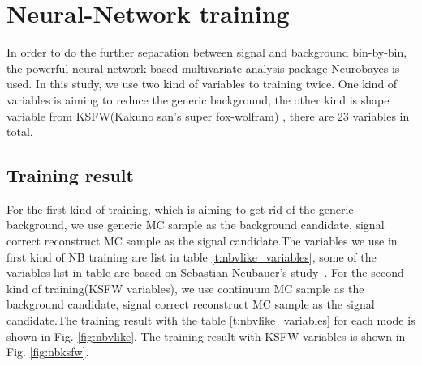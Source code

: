 \section{Neural-Network training}
In order to do the further separation between signal and background bin-by-bin, the powerful neural-network based multivariate analysis package Neurobayes is used. In this study, we use two kind of variables to training twice. One kind of variables is aiming to reduce the generic background; the other kind is shape variable from KSFW(Kakuno san's super fox-wolfram)\cite{ref:Lee2003} \cite{ref:fox1978}, there are 23 variables in total. 
\subsection{Training result} 
For the first kind of training, which is aiming to get rid of the generic background, we use generic MC sample as the background candidate, signal correct reconstruct MC sample as the signal candidate.The variables we use in first kind of NB training are list in table \ref{t:nbvlike_variables}, some of the variables list in table are based on Sebastian Neubauer's study~\cite{ref:Neubauer2011}. For the second kind of training(KSFW variables), we use continuum MC sample as the background candidate, signal correct reconstruct MC sample as the signal candidate.The training result with the table \ref{t:nbvlike_variables} for each mode is shown in Fig. \ref{fig:nbvlike}, The training result with KSFW variables is shown in Fig. \ref{fig:nbksfw}.
